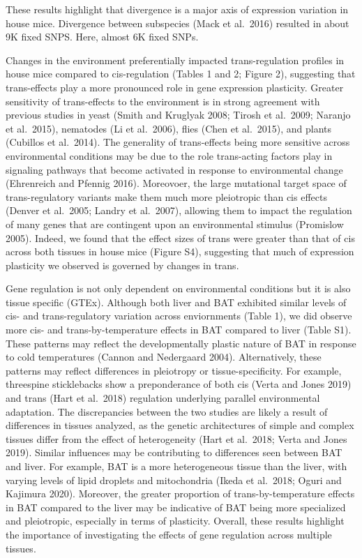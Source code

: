 \documentclass[9pt,twocolumn,twoside,lineno]{pnas-new}
\begin{document}
These results highlight that divergence is a major axis of expression
variation in house mice. Divergence between subspecies (Mack et
al.~2016) resulted in about 9K fixed SNPS. Here, almost 6K fixed SNPs.

Changes in the environment preferentially impacted trans-regulation
profiles in house mice compared to cis-regulation (Tables 1 and 2;
Figure 2), suggesting that trans-effects play a more pronounced role in
gene expression plasticity. Greater sensitivity of trans-effects to the
environment is in strong agreement with previous studies in yeast (Smith
and Kruglyak 2008; Tirosh et al.~2009; Naranjo et al.~2015), nematodes
(Li et al.~2006), flies (Chen et al.~2015), and plants (Cubillos et
al.~2014). The generality of trans-effects being more sensitive across
environmental conditions may be due to the role trans-acting factors
play in signaling pathways that become activated in response to
environmental change (Ehrenreich and Pfennig 2016). Moreovoer, the large
mutational target space of trans-regulatory variants make them much more
pleiotropic than cis effects (Denver et al.~2005; Landry et al.~2007),
allowing them to impact the regulation of many genes that are contingent
upon an environmental stimulus (Promislow 2005). Indeed, we found that
the effect sizes of trans were greater than that of cis across both
tissues in house mice (Figure S4), suggesting that much of expression
plasticity we observed is governed by changes in trans.

Gene regulation is not only dependent on environmental conditions but it
is also tissue specific (GTEx). Although both liver and BAT exhibited
similar levels of cis- and trans-regulatory variation across
enviornments (Table 1), we did observe more cis- and
trans-by-temperature effects in BAT compared to liver (Table S1). These
patterns may reflect the developmentally plastic nature of BAT in
response to cold temperatures (Cannon and Nedergaard 2004).
Alternatively, these patterns may reflect differences in pleiotropy or
tissue-specificity. For example, threespine sticklebacks show a
preponderance of both cis (Verta and Jones 2019) and trans (Hart et
al.~2018) regulation underlying parallel environmental adaptation. The
discrepancies between the two studies are likely a result of differences
in tissues analyzed, as the genetic architectures of simple and complex
tissues differ from the effect of heterogeneity (Hart et al.~2018; Verta
and Jones 2019). Similar influences may be contributing to differences
seen between BAT and liver. For example, BAT is a more heterogeneous
tissue than the liver, with varying levels of lipid droplets and
mitochondria (Ikeda et al.~2018; Oguri and Kajimura 2020). Moreover, the
greater proportion of trans-by-temperature effects in BAT compared to
the liver may be indicative of BAT being more specialized and
pleiotropic, especially in terms of plasticity. Overall, these results
highlight the importance of investigating the effects of gene regulation
across multiple tissues.
\end{document}
